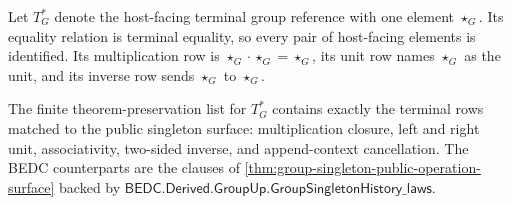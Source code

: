 \begin{definition}
\label{def:group-terminal-standard-reference}
Let $T_G^\ast$ denote the host-facing terminal group reference with one element
$\star_G$. Its equality relation is terminal equality, so every pair of
host-facing elements is identified. Its multiplication row is
$\star_G\cdot\star_G=\star_G$, its unit row names $\star_G$ as the unit, and its
inverse row sends $\star_G$ to $\star_G$.

The finite theorem-preservation list for $T_G^\ast$ contains exactly the
terminal rows matched to the public singleton surface: multiplication closure,
left and right unit, associativity, two-sided inverse, and append-context
cancellation. The BEDC counterparts are the clauses of
\autoref{thm:group-singleton-public-operation-surface} backed by
$\mathsf{BEDC.Derived.GroupUp.GroupSingletonHistory\_laws}$.
\end{definition}

